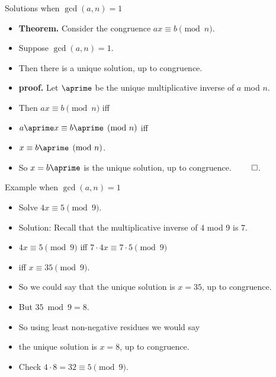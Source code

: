 \documentclass{beamer}
\begin{document}
\begin{frame}{Solutions when $\gcd(a,n)=1$}
\begin{itemize}
  \item \textbf{Theorem.} Consider the congruence $ax\equiv b \pmod n$.
  \item Suppose $\gcd(a,n) = 1$.
  \item Then there is a unique solution, up to congruence.
  \item \textbf{proof.} Let $\aprime$ be the unique multiplicative inverse
  of $a$ mod $n $.
  \item Then $ax\equiv b \pmod n$ iff
  \item $a\aprime x\equiv b\aprime \pmod n$ iff
  \item $x \equiv b\aprime \pmod n$.
  \item So $x=b\aprime$ is the unique solution, up to congruence. $\qed$.
\end{itemize}
\end{frame}

\begin{frame}{Example when $\gcd(a,n)=1$}
\begin{itemize}
  \item Solve $4x \equiv 5 \pmod 9$.
  \item Solution: Recall that the multiplicative inverse of 4 mod 9 is 7.
  \item $4x \equiv 5 \pmod 9$ iff $7\cdot 4 x  \equiv 7\cdot 5  \pmod 9$
  \item iff $x \equiv 35 \pmod 9$.
  \item So we could say that the unique solution is $x=35$, up to congruence.
  \item But $35\bmod 9 = 8$.
  \item So using least non-negative residues we would say
  \item the unique solution is $x=8$, up to congruence.
  \item Check $4\cdot 8 = 32 \equiv 5 \pmod 9$.
\end{itemize}
\end{frame}
\end{document}
